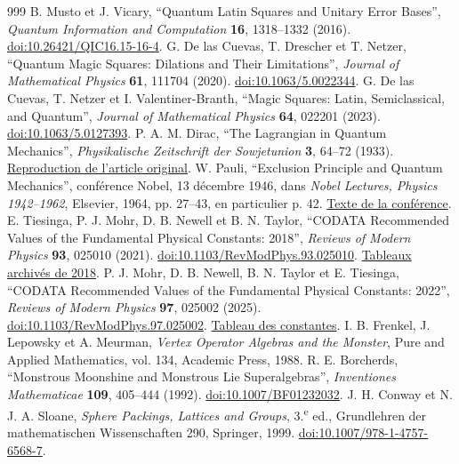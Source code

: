 \begin{thebibliography}{999}
 B. Musto et J. Vicary, ``Quantum Latin Squares and Unitary Error Bases'', \emph{Quantum Information and Computation} \textbf{16}, 1318--1332 (2016). \href{https://doi.org/10.26421/QIC16.15-16-4}{doi:10.26421/QIC16.15-16-4}.
 G. De las Cuevas, T. Drescher et T. Netzer, ``Quantum Magic Squares: Dilations and Their Limitations'', \emph{Journal of Mathematical Physics} \textbf{61}, 111704 (2020). \href{https://doi.org/10.1063/5.0022344}{doi:10.1063/5.0022344}.
 G. De las Cuevas, T. Netzer et I. Valentiner-Branth, ``Magic Squares: Latin, Semiclassical, and Quantum'', \emph{Journal of Mathematical Physics} \textbf{64}, 022201 (2023). \href{https://doi.org/10.1063/5.0127393}{doi:10.1063/5.0127393}.
 P. A. M. Dirac, ``The Lagrangian in Quantum Mechanics'', \emph{Physikalische Zeitschrift der Sowjetunion} \textbf{3}, 64--72 (1933). \href{https://www.informationphilosopher.com/solutions/scientists/dirac/Lagrangian_1933.pdf}{Reproduction de l'article original}.
 W. Pauli, ``Exclusion Principle and Quantum Mechanics'', conférence Nobel, 13 décembre 1946, dans \emph{Nobel Lectures, Physics 1942--1962}, Elsevier, 1964, pp. 27--43, en particulier p. 42. \href{https://www.nobelprize.org/uploads/2018/06/pauli-lecture.pdf}{Texte de la conférence}.
 E. Tiesinga, P. J. Mohr, D. B. Newell et B. N. Taylor, ``CODATA Recommended Values of the Fundamental Physical Constants: 2018'', \emph{Reviews of Modern Physics} \textbf{93}, 025010 (2021). \href{https://doi.org/10.1103/RevModPhys.93.025010}{doi:10.1103/RevModPhys.93.025010}. \href{https://physics.nist.gov/cuu/Constants/ArchiveASCII/allascii_2018.txt}{Tableaux archivés de 2018}.
 P. J. Mohr, D. B. Newell, B. N. Taylor et E. Tiesinga, ``CODATA Recommended Values of the Fundamental Physical Constants: 2022'', \emph{Reviews of Modern Physics} \textbf{97}, 025002 (2025). \href{https://doi.org/10.1103/RevModPhys.97.025002}{doi:10.1103/RevModPhys.97.025002}. \href{https://physics.nist.gov/cuu/Constants/Table/allascii.txt}{Tableau des constantes}.
 I. B. Frenkel, J. Lepowsky et A. Meurman, \emph{Vertex Operator Algebras and the Monster}, Pure and Applied Mathematics, vol. 134, Academic Press, 1988.
 R. E. Borcherds, ``Monstrous Moonshine and Monstrous Lie Superalgebras'', \emph{Inventiones Mathematicae} \textbf{109}, 405--444 (1992). \href{https://doi.org/10.1007/BF01232032}{doi:10.1007/BF01232032}.
 J. H. Conway et N. J. A. Sloane, \emph{Sphere Packings, Lattices and Groups}, 3.\textsuperscript{e} ed., Grundlehren der mathematischen Wissenschaften 290, Springer, 1999. \href{https://doi.org/10.1007/978-1-4757-6568-7}{doi:10.1007/978-1-4757-6568-7}.

\end{thebibliography}

